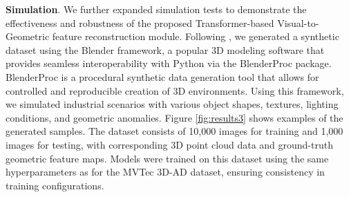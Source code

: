 \textbf{Simulation}. We further expanded simulation tests to demonstrate the effectiveness and robustness of the proposed Transformer-based Visual-to-Geometric feature reconstruction module. Following \cite{bonfiglioli2022eyecandies}, we generated a synthetic dataset using the Blender framework, a popular 3D modeling software that provides seamless interoperability with Python via the BlenderProc package. BlenderProc is a procedural synthetic data generation tool that allows for controlled and reproducible creation of 3D environments. Using this framework, we simulated industrial scenarios with various object shapes, textures, lighting conditions, and geometric anomalies. Figure \ref{fig:results3} shows examples of the generated samples. The dataset consists of 10,000 images for training and 1,000 images for testing, with corresponding 3D point cloud data and ground-truth geometric feature maps. Models were trained on this dataset using the same hyperparameters as for the MVTec 3D-AD dataset, ensuring consistency in training configurations.

